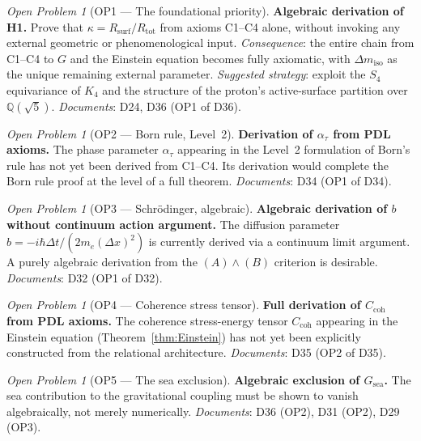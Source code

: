 \documentclass[11pt,a4paper]{article}
\theoremstyle{plain}
\theoremstyle{definition}
\theoremstyle{remark}
\newtheorem{openproblem}[theorem]{Open Problem}
\newcommand{\Kfour}{K_4}
\newcommand{\Rsurf}{R_{\mathrm{surf}}}
\newcommand{\Rtot}{R_{\mathrm{tot}}}
\begin{document}
\begin{openproblem}[OP1 — The foundational priority]
\label{op:H1}
\textbf{Algebraic derivation of H1.}
Prove that $\kappa = \Rsurf/\Rtot$ from axioms C1--C4 alone, without invoking any external geometric or phenomenological input.
\emph{Consequence}: the entire chain from C1--C4 to $G$ and the Einstein equation becomes fully axiomatic, with $\Delta m_{\mathrm{iso}}$ as the unique remaining external parameter.
\emph{Suggested strategy}: exploit the $S_4$ equivariance of $\Kfour$ and the structure of the proton's active-surface partition over $\mathbb{Q}(\sqrt{5})$.
\emph{Documents}: D24, D36 (OP1 of D36).
\end{openproblem}

\begin{openproblem}[OP2 — Born rule, Level~2]
\label{op:born_level2}
\textbf{Derivation of $\alpha_\tau$ from PDL axioms.}
The phase parameter $\alpha_\tau$ appearing in the Level~2 formulation of Born's rule has not yet been derived from C1--C4.
Its derivation would complete the Born rule proof at the level of a full theorem.
\emph{Documents}: D34 (OP1 of D34).
\end{openproblem}

\begin{openproblem}[OP3 — Schr\"odinger, algebraic]
\label{op:schrodinger_b}
\textbf{Algebraic derivation of $b$ without continuum action argument.}
The diffusion parameter $b=-i\hbar\Delta t/(2m_e(\Delta x)^2)$ is currently derived via a continuum limit argument.
A purely algebraic derivation from the $(A)\wedge(B)$ criterion is desirable.
\emph{Documents}: D32 (OP1 of D32).
\end{openproblem}

\begin{openproblem}[OP4 — Coherence stress tensor]
\label{op:Ccoh}
\textbf{Full derivation of $C_{\mathrm{coh}}$ from PDL axioms.}
The coherence stress-energy tensor $C_{\mathrm{coh}}$ appearing in the Einstein equation (Theorem~\ref{thm:Einstein}) has not yet been explicitly constructed from the relational architecture.
\emph{Documents}: D35 (OP2 of D35).
\end{openproblem}

\begin{openproblem}[OP5 — The sea exclusion]
\label{op:sea}
\textbf{Algebraic exclusion of $G_{\mathrm{sea}}$.}
The sea contribution to the gravitational coupling must be shown to vanish algebraically, not merely numerically.
\emph{Documents}: D36 (OP2), D31 (OP2), D29 (OP3).
\end{openproblem}
\end{document}
